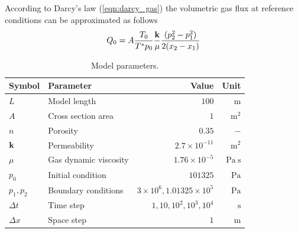According to Darcy's law (\ref{eqn:darcy_gas}) the volumetric gas flux at reference conditions can be approximated as follows
\begin{equation}
Q_0
=
A
\frac{T_0}{T^* p_0}
\frac{\k}{\mu}
\frac{(p_2^2-p_1^2)}{2(x_2-x_1)}
\label{eqn:gasflux_analytical}
\end{equation}
\begin{table}[htb]
\caption{\label{tab:compressible_test}Model parameters.}
\begin{center}
\begin{tabular}{llrr}
\toprule
Symbol & Parameter & Value & Unit \\
\midrule
$L$ & Model length & $100$ & $\mathrm{m}$\\
$A$ & Cross section area & $1$  & $\mathrm{m^2}$ \\
$n$ & Porosity & $0.35$  & $-$ \\
$\mathbf k$ & Permeability & $2.7\times 10^{-11}$ & $\mathrm{m^2}$\\
$\mu$ & Gas dynamic viscosity & $1.76\times 10^{-5}$ & $\mathrm{Pa~s}$\\
$p_0$ & Initial condition & $101325$ & $\mathrm{Pa}$\\
$p_1, p_2$ & Boundary conditions & $3 \times 10^6, 1.01325 \times 10^5$ & $\mathrm{Pa}$\\
$\Delta t$ & Time step & $1,10,10^2,10^3,10^4$ & $\mathrm{s}$\\
$\Delta x$ & Space step & $1$ & $\mathrm{m}$\\
\bottomrule
\end{tabular}
\end{center}
\end{table}
